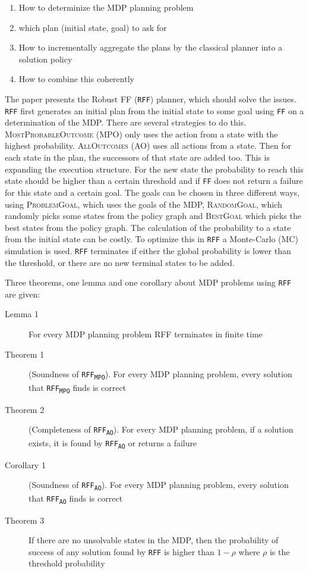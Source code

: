 \documentclass[runningheads,a4paper]{llncs}
\begin{document}
\begin{enumerate}
	\item How to determinize the MDP planning problem
	\item which plan (initial state, goal) to ask for
	\item How to incrementally aggregate the plans by the classical planner
		into a solution policy
	\item How to combine this coherently
\end{enumerate}

The paper presents the Robust FF (\texttt{RFF}) planner, which should solve the
issues. \texttt{RFF} first generates an initial plan from the initial state to
some goal using \texttt{FF} on a determination of the MDP\@. There are several
strategies to do this. \textsc{MostProbableOutcome} (MPO) only uses the action
from a state with the highest probability. \textsc{AllOutcomes} (AO) uses all
actions from a state. Then for each state in the plan, the successors of that
state are added too. This is expanding the execution structure. For the new
state the probability to reach this state should be higher than a certain
threshold and if \texttt{FF} does not return a failure for this state and a
certain goal. The goals can be chosen in three different ways, using
\textsc{ProblemGoal}, which uses the goals of the MDP, \textsc{RandomGoal},
which randomly picks some states from the policy graph and \textsc{BestGoal}
which picks the best states from the policy graph. The calculation of the
probability to a state from the initial state can be costly. To optimize this
in \texttt{RFF} a Monte-Carlo (MC) simulation is used. \texttt{RFF} terminates
if either the global probability is lower than the threshold, or there are no
new terminal states to be added.

Three theorems, one lemma and one corollary about MDP problems using
\texttt{RFF} are given:

\begin{description}
	\item[Lemma 1] For every MDP planning problem RFF terminates in
		finite time
	\item[Theorem 1] (Soundness of \texttt{RFF\textsubscript{MPO}}). For every
		MDP planning problem, every solution that
		\texttt{RFF\textsubscript{MPO}} finds is correct
	\item[Theorem 2] (Completeness of \texttt{RFF\textsubscript{AO}}). For
		every MDP planning problem, if a solution exists, it is found by
		\texttt{RFF\textsubscript{AO}} or returns a failure
	\item[Corollary 1] (Soundness of \texttt{RFF\textsubscript{AO}}). For every
		MDP planning problem, every solution that
		\texttt{RFF\textsubscript{AO}} finds is correct
	\item[Theorem 3] If there are no unsolvable states in the MDP, then the
		probability of success of any solution found by \texttt{RFF} is
		higher than $1 - \rho$ where $\rho$ is the threshold probability
\end{description}
\end{document}
